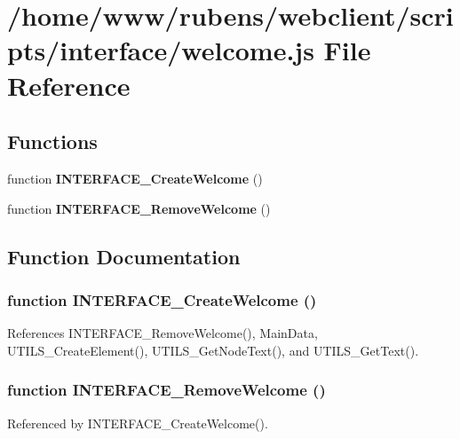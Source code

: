 \section{/home/www/rubens/webclient/scripts/interface/welcome.js File Reference}
\label{welcome_8js}
\subsection*{Functions}
\begin{CompactItemize}
\item 
function {\bf INTERFACE\_\-CreateWelcome} ()
\item 
function {\bf INTERFACE\_\-RemoveWelcome} ()
\end{CompactItemize}


\subsection{Function Documentation}
\subsubsection[INTERFACE\_\-CreateWelcome]{\setlength{\rightskip}{0pt plus 5cm}function INTERFACE\_\-CreateWelcome ()}\label{welcome_8js_08edb81f74f4d70e8e9275afc4756181}




References INTERFACE\_\-RemoveWelcome(), MainData, UTILS\_\-CreateElement(), UTILS\_\-GetNodeText(), and UTILS\_\-GetText().
\subsubsection[INTERFACE\_\-RemoveWelcome]{\setlength{\rightskip}{0pt plus 5cm}function INTERFACE\_\-RemoveWelcome ()}\label{welcome_8js_1fe27b085197d760c33b1a1db3f6c63e}




Referenced by INTERFACE\_\-CreateWelcome().